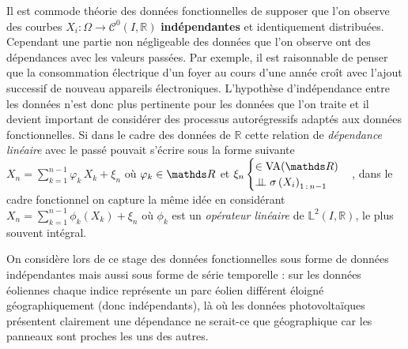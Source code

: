 Il est commode théorie des données fonctionnelles de supposer que l'on observe des courbes $X_i : \Omega \rightarrow \mathcal C^0(I, \mathds R)$ \textbf{indépendantes} et identiquement distribuées. Cependant une partie non négligeable des données que l'on observe ont des dépendances avec les valeurs passées. Par exemple, il est raisonnable de penser que la consommation électrique d'un foyer au cours d'une année croît avec l'ajout successif de nouveau appareils électroniques. L'hypothèse d'indépendance entre les données n'est donc plus pertinente pour les données que l'on traite et il devient important de considérer des processus autorégressifs adaptés aux données fonctionnelles.
Si dans le cadre des données de $\mathds R$ cette relation de \emph{dépendance linéaire} avec le passé pouvait s'écrire sous la forme suivante
$X_n = \sum\limits_{k=1}^{n-1} \varphi_k \, X_k + \xi_n$ où $\varphi_k \in \grandR$
et
$\xi_n \begin{cases} \in \operatorname{VA}(\grandR) \\ \indep \sigma\left( X_i \right)_{1\,: \, n-1}\end{cases}$,
dans le cadre fonctionnel on capture la même idée en considérant
$X_n = \sum\limits_{k=1}^{n-1} \phi_k \left( X_k \right) + \xi_n$ où $\phi_k$
est un \emph{opérateur linéaire} de $\mathds L^2(I, \mathds R)$,
le plus souvent intégral.


On considère lors de ce stage des données fonctionnelles sous forme de données indépendantes mais aussi sous forme de série temporelle : sur les données éoliennes chaque indice représente un parc éolien différent éloigné géographiquement (donc indépendants), là où les données photovoltaïques présentent clairement une dépendance ne serait-ce que géographique car les panneaux sont proches les uns des autres.





